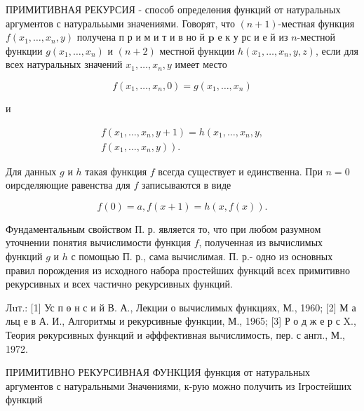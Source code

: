 \documentclass[10pt]{article}
\begin{document}
ПРИМИТИВНАЯ РЕКУРСИЯ - способ определөния функций от натуральных аргументов с натуралььыми значениями. Говорят, что $(n+1)$-местная функция $f\left(x_{1}, \ldots, x_{n}, y\right)$ получена п р и м и т и в но й $\mathbf{p}$ е к у рс и е й из $n$-местной функции $g\left(x_{1}, \ldots, x_{n}\right)$ и $(n+2)$ местной функции $h\left(x_{1}, \ldots, x_{n}, y, z\right)$, если для всех натуральных значений $x_{1}, \ldots, x_{n}, y$ имеет место



\[

f\left(x_{1}, \ldots, x_{n}, 0\right)=g\left(x_{1}, \ldots, x_{n}\right)

\]



и



\[

\begin{gathered}

f\left(x_{1}, \ldots, x_{n}, y+1\right)=h\left(x_{1}, \ldots, x_{n}, y,\right. \\

\left.f\left(x_{1}, \ldots, x_{n}, y\right)\right) .

\end{gathered}

\]



Для данных $g$ и $h$ такая функция $f$ всегда существует и единственна. При $n=0$ оирсделяющие равенства для $f$ записываются в виде



\[

f(0)=a, f(x+1)=h(x, f(x)) .

\]



Фундаментальным свойством П. р. является то, что при любом разумном уточнении понятия вычислимости функция $f$, полученная из вычислимых функций $g$ и $h$ с помощью П. р., сама вычислимая. П. р.- одно из основных правил порождения из исходного набора простейших функций всех примитивно рекурсивных и всех частично рекурсивных функций.



Лuт.: [1] Ус п ө н с и й В. А., Лекции о вычислимых функциях, М., 1960; [2] М а льц е в А. И., Алгоритмы и рекурсивные функции, М., 1965; [3] Р о д ж е р с X., Теория рөкурсивных функций и әфффективная вычислимость, пер. с англ., М., 1972.



ПРИМИТИВНО РЕКУРСИВНАЯ ФУНКЦИЯ функция от натуральных аргументов с натуральными Значөниями, к-рую можно получить из Ігростейших функций
\end{document}
